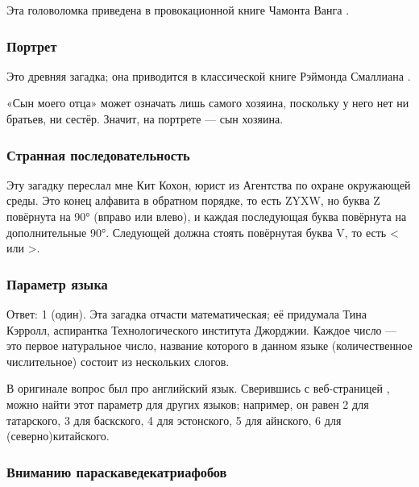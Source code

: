 Эта головоломка приведена в провокационной книге Чамонта Ванга \cite{58}.

\subsubsection*{Портрет}

Это древняя загадка;
она приводится в классической книге Рэймонда Смаллиана \cite{55}.

«Сын моего отца» может означать лишь самого хозяина, поскольку у него нет ни братьев, ни сестёр.
Значит, на портрете — сын хозяина.

\subsubsection*{Странная последовательность}

Эту загадку переслал мне Кит Кохон, юрист из Агентства по охране окружающей среды.
Это конец алфавита в обратном порядке, то есть ZYXW, но буква Z повёрнута на 90° (вправо или влево), и каждая последующая буква повёрнута на дополнительные 90°.
Следующей должна стоять повёрнутая буква V, то есть < или >.

\subsubsection*{Параметр языка}

Ответ: 1 (один).
Эта загадка отчасти математическая; её придумала Тина Кэрролл, аспирантка Технологического института Джорджии. 
Каждое число — это первое натуральное число, название которого в данном языке (количественное числительное) состоит из нескольких слогов.

\begin{addedbytheeditors}
В оригинале вопрос был про английский язык.
Сверившись с веб-страницей \cite{numerals}, можно найти этот параметр для других языков;
например, он равен 2 для татарского, 3 для баскского, 4 для эстонского, 5 для айнского, 6 для (северно)китайского. \pr
\end{addedbytheeditors}


\subsubsection*{Вниманию параскаведекатриафобов}

